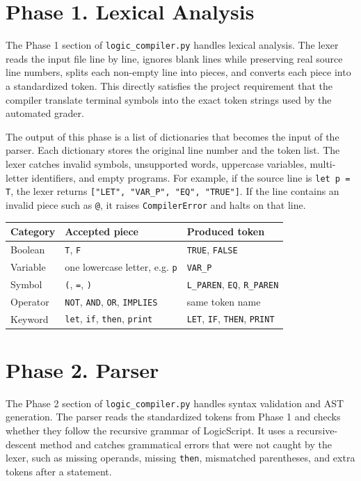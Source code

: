 \documentclass[10pt]{article}
\begin{document}
\section{Phase 1. Lexical Analysis}
The Phase 1 section of \texttt{logic\_compiler.py} handles lexical analysis. The lexer reads the input file line by line, ignores blank lines while preserving real source line numbers, splits each non-empty line into pieces, and converts each piece into a standardized token. This directly satisfies the project requirement that the compiler translate terminal symbols into the exact token strings used by the automated grader.

The output of this phase is a list of dictionaries that becomes the input of the parser. Each dictionary stores the original line number and the token list. The lexer catches invalid symbols, unsupported words, uppercase variables, multi-letter identifiers, and empty programs. For example, if the source line is \texttt{let p = T}, the lexer returns \texttt{["LET", "VAR\_P", "EQ", "TRUE"]}. If the line contains an invalid piece such as \texttt{@}, it raises \texttt{CompilerError} and halts on that line.

\begin{center}
\begin{tabular}{L{0.22\textwidth} L{0.26\textwidth} L{0.40\textwidth}}
\toprule
Category & Accepted piece & Produced token \\
\midrule
Boolean & \texttt{T}, \texttt{F} & \texttt{TRUE}, \texttt{FALSE} \\
Variable & one lowercase letter, e.g. \texttt{p} & \texttt{VAR\_P} \\
Symbol & \texttt{(}, \texttt{=}, \texttt{)} & \texttt{L\_PAREN}, \texttt{EQ}, \texttt{R\_PAREN} \\
Operator & \texttt{NOT}, \texttt{AND}, \texttt{OR}, \texttt{IMPLIES} & same token name \\
Keyword & \texttt{let}, \texttt{if}, \texttt{then}, \texttt{print} & \texttt{LET}, \texttt{IF}, \texttt{THEN}, \texttt{PRINT} \\
\bottomrule
\end{tabular}
\end{center}

\section{Phase 2. Parser}
The Phase 2 section of \texttt{logic\_compiler.py} handles syntax validation and AST generation. The parser reads the standardized tokens from Phase 1 and checks whether they follow the recursive grammar of LogicScript. It uses a recursive-descent method and catches grammatical errors that were not caught by the lexer, such as missing operands, missing \texttt{then}, mismatched parentheses, and extra tokens after a statement.
\end{document}
